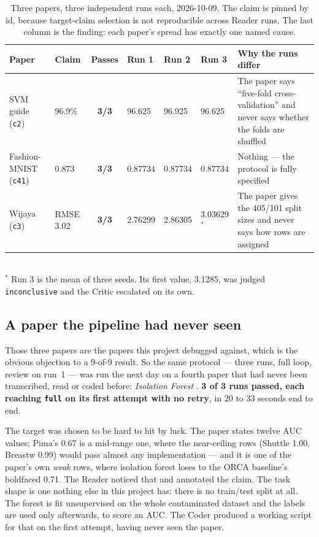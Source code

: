 \documentclass[10pt,twocolumn]{article}
\newcommand{\squeeze}{\setlength{\tabcolsep}{4pt}}
\begin{document}
\begin{table}[tbp]
\centering
\small
\caption{Three papers, three independent runs each, 2026-10-09. The claim is pinned by id,
because target-claim selection is not reproducible across Reader runs. The last column is the
finding: each paper's spread has exactly one named cause.}
\label{tab:repeat}
\squeeze
\begin{tabular}{L{0.17\textwidth}L{0.09\textwidth}cL{0.07\textwidth}L{0.07\textwidth}L{0.07\textwidth}L{0.29\textwidth}}
\toprule
Paper & Claim & Passes & Run 1 & Run 2 & Run 3 & Why the runs differ \\
\midrule
SVM guide (\texttt{c2}) & 96.9\% & \textbf{3/3} & 96.625 & 96.925 & 96.625 & The paper says
  ``five-fold cross-validation'' and never says whether the folds are shuffled \\
Fashion-MNIST (\texttt{c41}) & 0.873 & \textbf{3/3} & 0.87734 & 0.87734 & 0.87734 & Nothing --- the
  protocol is fully specified \\
Wijaya (\texttt{c3}) & RMSE 3.02 & \textbf{3/3} & 2.76299 & 2.86305 & 3.03629$^{*}$ & The paper
  gives the 405/101 split sizes and never says how rows are assigned \\
\bottomrule
\end{tabular}
\\[2pt]
{\small $^{*}$ Run 3 is the mean of three seeds. Its first value, 3.1285, was judged
\texttt{inconclusive} and the Critic escalated on its own.}
\end{table}

\subsection{A paper the pipeline had never seen}
\label{sec:unseen}

Those three papers are the papers this project debugged against, which is the obvious objection
to a 9-of-9 result. So the same protocol --- three runs, full loop, review on run~1 --- was run
the next day on a fourth paper that had never been transcribed, read or coded before:
\emph{Isolation Forest} \cite{liu2008iforest}. \textbf{3 of 3 runs passed, each reaching
\texttt{full} on its first attempt with no retry}, in 20 to 33 seconds end to end.

The target was chosen to be hard to hit by luck. The paper states twelve AUC values; Pima's
0.67 is a mid-range one, where the near-ceiling rows (Shuttle 1.00, Breastw 0.99) would pass
almost any implementation --- and it is one of the paper's own \emph{weak} rows, where isolation
forest loses to the ORCA baseline's boldfaced 0.71. The Reader noticed that and annotated the
claim. The task shape is one nothing else in this project has: there is no train/test split at
all. The forest is fit unsupervised on the whole contaminated dataset and the labels are used
only afterwards, to score an AUC. The Coder produced a working script for that on the first
attempt, having never seen the paper.
\end{document}
